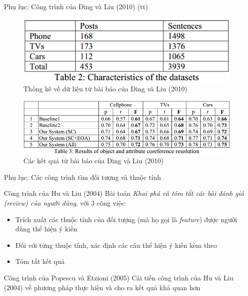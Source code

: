 \documentclass[9pt,xcolor=table,hyperref=unicode]{beamer}
\begin{document}
		\begin{frame}{Phụ lục: Công trình của Ding và Liu (2010) (tt)}
			\begin{figure}[H]
				\centering							
				\includegraphics[scale=0.45]{images/base_result_1}				
				\caption{Thống kê về dữ liệu từ bài báo của Ding và Liu (2010)}				
			\end{figure}
			\begin{figure}[H]
				\centering							
				\includegraphics[scale=0.45]{images/base_result_2}				
				\caption{Các kết quả từ bài báo của Ding và Liu (2010)}				
			\end{figure}
		\end{frame}

		\begin{frame}{Phụ lục: Các công trình tìm đối tượng và thuộc tính}
			\begin{block}{Công trình của Hu và Liu (2004)}
				Bài toán \textit{Khai phá và tóm tắt các bài đánh giá (review) của người dùng}, với 3 công việc: 
				\begin{itemize}
					\item{Trích xuất các thuộc tính của đối tượng (mà họ gọi là \textit{feature}) được người dùng thể hiện ý kiến}
					\item{Đối với từng thuộc tính, xác định các câu thể hiện ý kiến kèm theo}
					\item{Tóm tắt kết quả}
				\end{itemize}
			\end{block}
			\begin{block}{Công trình của Popescu và Etzioni (2005)}
				Cải tiến công trình của Hu và Liu (2004) về phương pháp thực hiện và cho ra kết quả khả quan hơn
			\end{block}
		\end{frame}		
\end{document}
